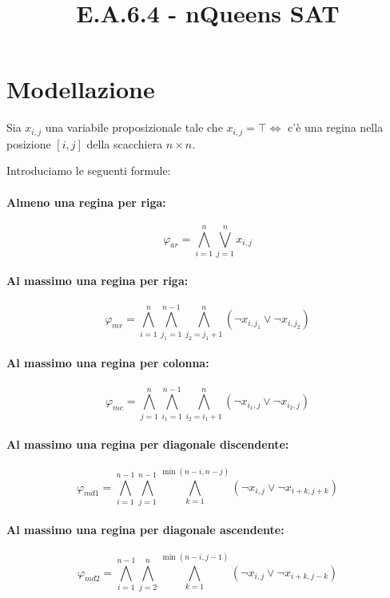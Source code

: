 \documentclass[10pt]{article}
\title{E.A.6.4 - nQueens SAT}
\author{}
\date{}
\begin{document}
\maketitle
\vspace{-6em}

\section{Modellazione}

Sia $x_{i,j}$ una variabile proposizionale tale che $x_{i,j} = \top \iff$ c'è una regina nella posizione $[i, j]$ della scacchiera $n \times n$. 

Introduciamo le seguenti formule:

\paragraph{Almeno una regina per riga:}
\[
    \varphi_{ar} = \bigwedge_{i=1}^{n} \bigvee_{j=1}^{n} x_{i,j}
\]

\paragraph{Al massimo una regina per riga:}
\[
\varphi_{mr} =\bigwedge_{i=1}^{n} \bigwedge_{j_1=1}^{n-1} \bigwedge_{j_2=j_1+1}^{n} (\neg x_{i,j_1} \lor \neg x_{i,j_2})
\]

\paragraph{Al massimo una regina per colonna:}
\[
    \varphi_{mc}=\bigwedge_{j=1}^{n} \bigwedge_{i_1=1}^{n-1} \bigwedge_{i_2=i_1+1}^{n} (\neg x_{i_1,j} \lor \neg x_{i_2,j})
\]

\paragraph{Al massimo una regina per diagonale discendente:}
\[
    \varphi_{md1}=\bigwedge_{i=1}^{n-1} \bigwedge_{j=1}^{n-1} \bigwedge_{k=1}^{\min(n-i, n-j)} (\neg x_{i,j} \lor \neg x_{i+k, j+k})
\]

\paragraph{Al massimo una regina per diagonale ascendente:}
\[
\varphi_{md2}=\bigwedge_{i=1}^{n-1} \bigwedge_{j=2}^{n} \bigwedge_{k=1}^{\min(n-i, j-1)} (\neg x_{i,j} \lor \neg x_{i+k, j-k})
\]
\end{document}
